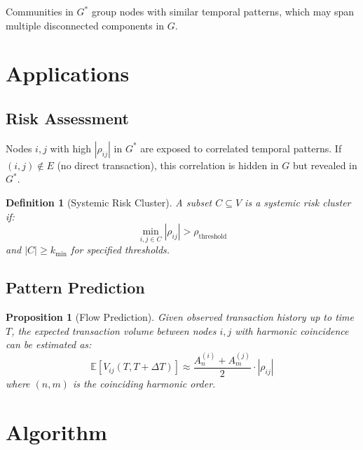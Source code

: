 \documentclass[12pt]{article}
\newtheorem{definition}[theorem]{Definition}
\newtheorem{proposition}[theorem]{Proposition}
\begin{document}
Communities in $G^*$ group nodes with similar temporal patterns, which may span multiple disconnected components in $G$.

\section{Applications}

\subsection{Risk Assessment}

Nodes $i,j$ with high $|\rho_{ij}|$ in $G^*$ are exposed to correlated temporal patterns. If $(i,j) \notin E$ (no direct transaction), this correlation is hidden in $G$ but revealed in $G^*$.

\begin{definition}[Systemic Risk Cluster]
A subset $C \subseteq V$ is a systemic risk cluster if:
$$
\min_{i,j \in C} |\rho_{ij}| > \rho_{\text{threshold}}
$$
and $|C| \geq k_{\text{min}}$ for specified thresholds.
\end{definition}

\subsection{Pattern Prediction}

\begin{proposition}[Flow Prediction]
Given observed transaction history up to time $T$, the expected transaction volume between nodes $i,j$ with harmonic coincidence can be estimated as:
$$
\mathbb{E}[V_{ij}(T, T+\Delta T)] \approx \frac{A_n^{(i)} + A_m^{(j)}}{2} \cdot |\rho_{ij}|
$$
where $(n,m)$ is the coinciding harmonic order.
\end{proposition}

\section{Algorithm}
\end{document}
